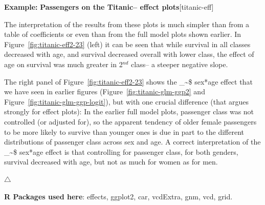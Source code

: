 \documentclass{article}
\makeatletter
\newcommand{\figref}[1]{Figure~\ref{#1}}
\newcommand\code{\bgroup\@makeother\_\@makeother\~\@makeother\$\@codex}
\def\@codex#1{{\normalfont\ttfamily\hyphenchar\font=-1 #1}\egroup}
\let\proglang=\textsf
\newcommand{\R}{\proglang{R}\xspace}
\newenvironment{Example}[2][unnamed-example]%
  {\medskip\noindent\textbf{\textsf{Example:}}
   \textbf{#2}\hfill [#1]\par\smallskip
  }
  {\hfill $\triangle$}
\makeatother
\begin{document}
\begin{Example}[titanic-eff]{Passengers on the Titanic-- effect plots}
The interpretation of the results from these plots is much simpler than from 
a table of coefficients or even than from the full model plots shown earlier.
In \figref{fig:titanic-eff2-23} (left) it can be seen that while survival
in all classes decreased with age, and survival decreased overall with lower
class, the effect of age on survival was much greater in 2$^{nd}$ class-- a steeper
negative slope.


The right panel of \figref{fig:titanic-eff2-23}
shows the \code{sex*age} effect that we have seen in earlier
figures (\figref{fig:titanic-glm-ggp2} and \figref{fig:titanic-glm-ggp-logit}),
but with one crucial difference (that argues strongly for effect plots):
In the earlier full model
plots, passenger class was not controlled (or adjusted for),
so the apparent tendency of older female passengers to be more likely
to survive than younger ones is due in part to the different distributions
of passenger class across sex and age.
A correct interpretation of the \code{sex*age} effect is that
controlling for passenger class,
for both genders, survival decreased with age, but not as
much for women as for men.

\end{Example}



\bigskip\noindent
\textbf{\R Packages used here}: \textsf{effects, ggplot2, car, vcdExtra, gnm, vcd, grid}.



\end{document}
